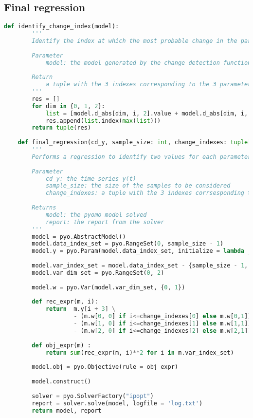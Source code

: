 \documentclass[11pt]{article}
\begin{document}
    \subsection{Final regression}
    \begin{lstlisting}[language=Python]
        def identify_change_index(model):
        '''
        Identify the index at which the most probable change in the parameters are observed. For each of the 3 parameters a, b, c, the most probable change is the identified as the max deviation index.
        
        Parameter
            model: the model generated by the change_detection function
        
        Return
            a tuple with the 3 indexes corresponding to the 3 parameters.
        '''
        res = []
        for dim in {0, 1, 2}:
            list = [model.d_abs[dim, i, 2].value + model.d_abs[dim, i, 1].value for i in model.var_d_set]
            res.append(list.index(max(list)))
        return tuple(res)
    
    def final_regression(cd_y, sample_size: int, change_indexes: tuple[int, int, int]):
        '''
        Performs a regression to identify two values for each parameters a,b and c, considering each of them have one change at one respective index.
        
        Parameter
            cd_y: the time series y(t)
            sample_size: the size of the samples to be considered
            change_indexes: a tuple with the 3 indexes corrsesponding to each of the 3 parameters. This could result from the function identify_change_index
        
        Returns
            model: the pyomo model solved
            report: the report from the solver
        '''
        model = pyo.AbstractModel()
        model.data_index_set = pyo.RangeSet(0, sample_size - 1)
        model.y = pyo.Param(model.data_index_set, initialize = lambda _, i: cd_y[i])
    
        model.var_index_set = model.data_index_set - {sample_size - 1, sample_size - 2, sample_size - 3}
        model.var_dim_set = pyo.RangeSet(0, 2)
        
        model.w = pyo.Var(model.var_dim_set, {0, 1})
    
        def rec_expr(m, i):
            return  m.y[i + 3] \
                    - (m.w[0, 0] if i<=change_indexes[0] else m.w[0,1]) * m.y[i + 2] \
                    - (m.w[1, 0] if i<=change_indexes[1] else m.w[1,1]) * m.y[i + 1] \
                    - (m.w[2, 0] if i<=change_indexes[2] else m.w[2,1]) * m.y[i]
    
        def obj_expr(m) :
            return sum(rec_expr(m, i)**2 for i in m.var_index_set)
    
        model.obj = pyo.Objective(rule = obj_expr)
    
        model.construct()
    
        solver = pyo.SolverFactory("ipopt")
        report = solver.solve(model, logfile = 'log.txt')
        return model, report
    \end{lstlisting}
    
\end{document}
